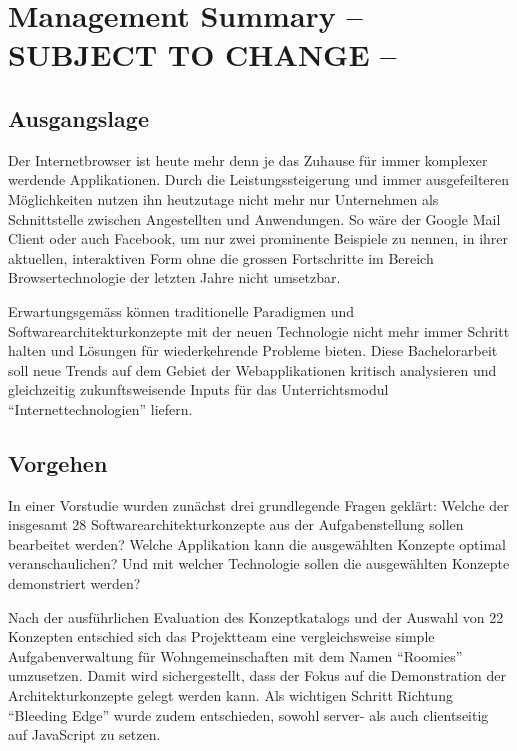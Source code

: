 \chapter{Management Summary  -- SUBJECT TO CHANGE --}

\section{Ausgangslage}
Der Internetbrowser ist heute mehr denn je das Zuhause für immer komplexer werdende Applikationen. Durch die Leistungssteigerung und immer ausgefeilteren Möglichkeiten nutzen ihn heutzutage nicht mehr nur Unternehmen als Schnittstelle zwischen Angestellten und Anwendungen. So wäre der Google Mail Client oder auch Facebook, um nur zwei prominente Beispiele zu nennen, in ihrer aktuellen, interaktiven Form ohne die grossen Fortschritte im Bereich Browsertechnologie der letzten Jahre nicht umsetzbar.

Erwartungsgemäss können traditionelle Paradigmen und Softwarearchitekturkonzepte mit der neuen Technologie nicht mehr immer Schritt halten und Lösungen für wiederkehrende Probleme bieten. Diese Bachelorarbeit soll neue Trends auf dem Gebiet der Webapplikationen kritisch analysieren und gleichzeitig zukunftsweisende Inputs für das Unterrichtsmodul ``Internettechnologien'' liefern.

\section{Vorgehen}
In einer Vorstudie wurden zunächst drei grundlegende Fragen geklärt: Welche der insgesamt 28 Softwarearchitekturkonzepte aus der Aufgabenstellung sollen bearbeitet werden? Welche Applikation kann die ausgewählten Konzepte optimal veranschaulichen? Und mit welcher Technologie sollen die ausgewählten Konzepte demonstriert werden?

Nach der ausführlichen Evaluation des Konzeptkatalogs und der Auswahl von 22 Konzepten entschied sich das Projektteam eine vergleichsweise simple Aufgabenverwaltung für Wohngemeinschaften mit dem Namen ``Roomies'' umzusetzen. Damit wird sichergestellt, dass der Fokus auf die Demonstration der Architekturkonzepte gelegt werden kann. Als wichtigen Schritt Richtung ``Bleeding Edge'' wurde zudem entschieden, sowohl server- als auch clientseitig auf JavaScript zu setzen.

